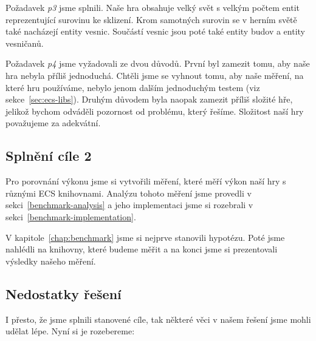 Požadavek \textit{p3} jsme splnili. Naše hra obsahuje velký svět s velkým počtem entit reprezentující surovinu ke sklizení. Krom samotných surovin se v herním světě také nacházejí entity vesnic. Součástí vesnic jsou poté také entity budov a entity vesničanů.

Požadavek \textit{p4} jsme vyžadovali ze dvou důvodů. První byl zamezit tomu, aby naše hra nebyla příliš jednoduchá. Chtěli jsme se vyhnout tomu, aby naše měření, na které hru používáme, nebylo jenom dalším jednoduchým testem (viz sekce~\ref{sec:ecs-libs}). Druhým důvodem byla naopak zamezit příliš složité hře, jelikož bychom odváděli pozornost od problému, který řešíme. Složitost naší hry považujeme za adekvátní.

\subsection{Splnění cíle 2}
Pro porovnání výkonu jsme si vytvořili měření, které měří výkon naší hry s různými ECS knihovnami. Analýzu tohoto měření jsme provedli v sekci~\ref{benchmark-analysis} a jeho implementaci jsme si rozebrali v sekci~\ref{benchmark-implementation}.

V kapitole~\ref{chap:benchmark} jsme si nejprve stanovili hypotézu. Poté jsme nahlédli na knihovny, které budeme měřit a na konci jsme si prezentovali výsledky našeho měření.

\subsection{Nedostatky řešení}
I přesto, že jsme splnili stanovené cíle, tak některé věci v našem řešení jsme mohli udělat lépe. Nyní si je rozebereme:


